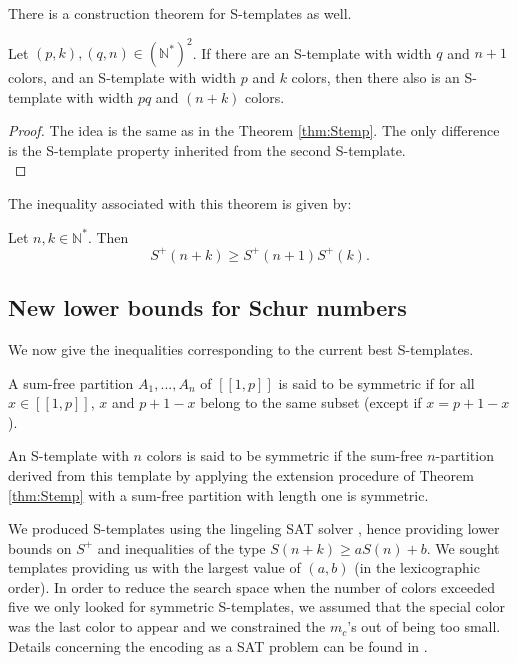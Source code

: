 \documentclass[final,onefignum,onetabnum]{siamart190516}
\begin{document}
There is a construction theorem for S-templates as well.

\begin{theorem}
	Let \((p,k), (q,n) \in (\mathbb{N}^*)^2\). If there are an S-template with width \(q\) and \(n+1\) colors,
	and an S-template with width \(p\) and \(k\) colors, then there also is an S-template with width \(pq\) and \((n+k)\) 
	colors.
\end{theorem}

\begin{proof}
The idea is the same as in the Theorem \ref{thm:Stemp}. The only difference is the S-template property inherited 
from the second S-template. \\
\end{proof}
	
The inequality associated with this theorem is given by:
	
\begin{corollary}
	Let \(n, k \in \mathbb{N}^*\). Then
	\[ S^+(n+k) \geqslant S^+(n+1)S^+(k).\]
\end{corollary}


\subsection{New lower bounds for Schur numbers}
\label{subsec:lowS}

We now give the inequalities corresponding to the current  best S-templates.

\begin{definition}
A sum-free partition \(A_1, ..., A_n\) of \([\![1, p]\!]\) is said to be symmetric if for all \( x \in [\![1, p]\!]\), 
\(x\) and \(p + 1 - x\) belong to the same subset (except if \(x = p + 1 - x\)).

An S-template with \(n\) colors is said to be symmetric if the sum-free \(n\)-partition derived 
from this template by applying the extension procedure of Theorem \ref{thm:Stemp} with a sum-free 
partition with length one is symmetric. 
\end{definition}

We produced S-templates using the lingeling SAT solver \cite{Lingeling2017}, hence providing lower bounds on 
\(S^+\) and inequalities of the type \(S(n+k) \geqslant a S(n) + b\). We sought templates providing us with 
the largest value of \((a, b)\) (in the lexicographic order). In order to reduce the search space when the number 
of colors exceeded five we only looked for symmetric S-templates, we assumed that the special color was the last 
color to appear and we constrained the \(m_c\)'s out of being too small. Details concerning the encoding as a SAT 
problem can be found in \cite{Heule2017}.
\end{document}
